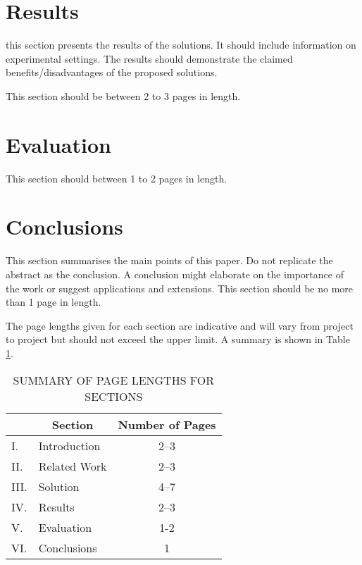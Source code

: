 \documentclass[12pt,a4paper]{article}
\begin{document}
\section{Results}

this section presents the results of the solutions.  It should include information on experimental settings.  The results should demonstrate the claimed benefits/disadvantages of the proposed solutions.

This section should be between 2 to 3 pages in length.

\section{Evaluation}

This section should between 1 to 2 pages in length.

\section{Conclusions}

This section summarises the main points of this paper.  Do not replicate the abstract as the conclusion.  A conclusion might elaborate on the importance of the work or suggest applications and extensions.  This section should be no more than 1 page in length.

The page lengths given for each section are indicative and will vary from project to project but should not exceed the upper limit.  A summary is shown in Table \ref{summary}.

\begin{table}[htb]
\centering
\caption{SUMMARY OF PAGE LENGTHS FOR SECTIONS}
\vspace*{6pt}
\label{summary}
\begin{tabular}{|ll|c|} \hline
& \multicolumn{1}{c|}{\bf Section} & {\bf Number of Pages} \\ \hline
I. & Introduction & 2--3 \\ \hline
II. & Related Work & 2--3 \\ \hline
III. & Solution & 4--7 \\ \hline
IV. & Results & 2--3 \\ \hline
V. & Evaluation & 1-2 \\ \hline
VI. & Conclusions & 1 \\ \hline
\end{tabular}
\end{table}



\end{document}
